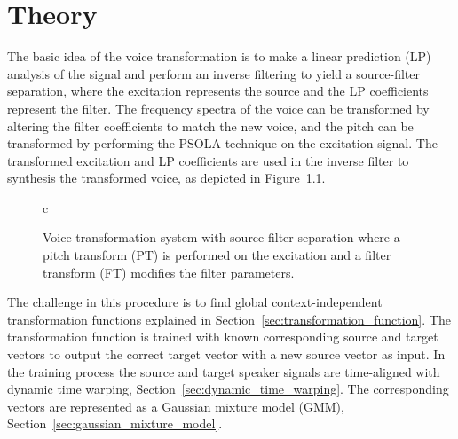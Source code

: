 \chapter{Theory} %
\label{cha:theory}

The basic idea of the voice transformation is to make a linear prediction (LP) analysis of the signal and perform an inverse filtering to yield a source-filter separation, where the excitation represents the source and the LP coefficients represent the filter. The frequency spectra of the voice can be transformed by altering the filter coefficients to match the new voice, and the pitch can be transformed by performing the PSOLA technique on the excitation signal. The transformed excitation and LP coefficients are used in the inverse filter to synthesis the transformed voice, as depicted in Figure~\ref{fig:transformation_system}.
\begin{figure}[htbp]
  \begin{center}
  \begin{tabular}[h]{c}
  \end{tabular}
  \caption{Voice transformation system with source-filter separation where a pitch transform (PT) is performed on the excitation and a filter transform (FT) modifies the filter parameters.}
  \label{fig:transformation_system}
  \end{center}
\end{figure}
 

The challenge in this procedure is to find global context-independent transformation functions explained in Section~\ref{sec:transformation_function}. The transformation function is trained with known corresponding source and target vectors to output the correct target vector with a new source vector as input. In the training process the source and target speaker signals are time-aligned with dynamic time warping, Section~\ref{sec:dynamic_time_warping}. The corresponding vectors are represented as a Gaussian mixture model (GMM), Section~\ref{sec:gaussian_mixture_model}.


